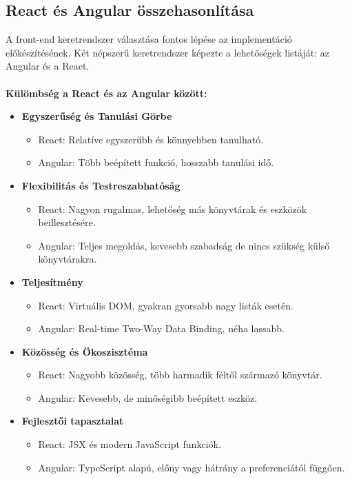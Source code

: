 \subsection*{React és Angular összehasonlítása}
A front-end keretrendszer választása fontos lépése az implementáció előkészítésének. Két népszerű keretrendszer képezte a lehetőségek listáját: az Angular és a React.
\\
\\
\textbf{Külömbség a React és az Angular között:}
\begin{itemize}[noitemsep, nolistsep]
    \item \textbf{Egyszerűség és Tanulási Görbe}
          \begin{itemize}
              \item React: Relatíve egyszerűbb és könnyebben tanulható.
              \item Angular: Több beépített funkció, hosszabb tanulási idő.
          \end{itemize}

    \item \textbf{Flexibilitás és Testreszabhatóság}
          \begin{itemize}
              \item React: Nagyon rugalmas, lehetőség más könyvtárak és eszközök beillesztésére.
              \item Angular: Teljes megoldás, kevesebb szabadság de nincs szükség külső könyvtárakra.
          \end{itemize}

    \item \textbf{Teljesítmény}
          \begin{itemize}
              \item React: Virtuális DOM, gyakran gyorsabb nagy listák esetén.
              \item Angular: Real-time Two-Way Data Binding, néha lassabb.
          \end{itemize}

    \item \textbf{Közösség és Ökoszisztéma}
          \begin{itemize}
              \item React: Nagyobb közösség, több harmadik féltől származó könyvtár.
              \item Angular: Kevesebb, de minőségibb beépített eszköz.
          \end{itemize}

    \item \textbf{Fejlesztői tapasztalat}
          \begin{itemize}
              \item React: JSX és modern JavaScript funkciók.
              \item Angular: TypeScript alapú, előny vagy hátrány a preferenciától függően.
          \end{itemize}
\end{itemize}
